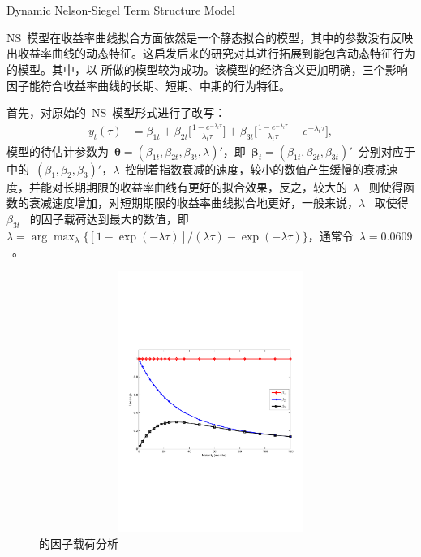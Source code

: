 \section{\dns}{Dynamic Nelson-Siegel Term Structure Model}\label{chap02-dev}

NS~模型在收益率曲线拟合方面依然是一个静态拟合的模型，其中的参数没有反映出收益率曲线的动态特征。这启发后来的研究对其进行拓展到能包含\yc 动态特征行为的模型。其中，以 所做的\dns 模型较为成功。该模型的经济含义更加明确，三个影响因子能符合收益率曲线的长期、短期、中期的行为特征。

首先，对原始的~NS~模型形式进行了改写：
\begin{align}\label{dns}
    y_{t}(\tau) &= \beta_{1t}
        + \beta_{2t} \big[\frac{1-e^{-\lambda_{t} \tau}} {\lambda_{t} \tau} \big]
        + \beta_{3t}\big[\frac{1-e^{-\lambda_{t} \tau}} {\lambda_{t} \tau} - e^{-\lambda_{t} \tau} \big],
  \end{align}
模型的待估计参数为~$\mathbf{\theta}=(\beta_{1t},\beta_{2t},\beta_{3t},\lambda)'$，即~$\mathbf{\beta}_t=(\beta_{1t},\beta_{2t},\beta_{3t})'$~分别对应于 中的~$(\beta_{1},\beta_{2},\beta_{3})'$，$\lambda$~控制着指数衰减的速度，较小的数值产生缓慢的衰减速度，并能对长期期限的收益率曲线有更好的拟合效果，反之，较大的~$\lambda$~ 则使得函数的衰减速度增加，对短期期限的收益率曲线拟合地更好，一般来说，$\lambda$~ 取使得~$\beta_{3t}$~ 的因子载荷达到最大的数值，即$\lambda=\arg \max_{\lambda}\big\{ [1-\exp{(-\lambda\tau)}]/ (\lambda \tau) - \exp{(-\lambda\tau)} \big\}$，通常令~$\lambda=0.0609$~。

  \begin{figure}%
    \includegraphics[width=15cm,height=8.5cm]{figures/tale_fig03}
    \caption{\dns 的因子载荷分析}
   \label{tale_fig03}
  \end{figure}

